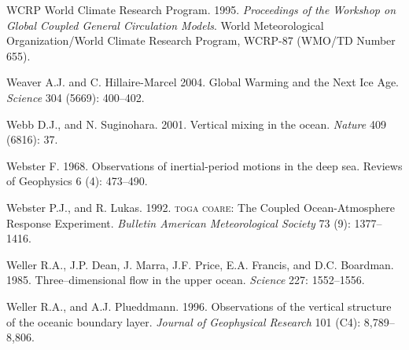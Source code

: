 \begin{thebibliography}{999}
WCRP World Climate Research Program.  1995. \textit{Proceedings of the
  Workshop on Global Coupled General Circulation Models}. World
Meteorological Organization/World Climate Research Program, WCRP-87
(WMO/TD Number 655).
%

Weaver A.J. and C. Hillaire-Marcel 2004. Global Warming and the Next
Ice Age. \textit{Science} 304 (5669): 400--402.
%

Webb D.J., and N. Suginohara.  2001. Vertical mixing in the ocean.
\textit{Nature} 409 (6816): 37.
%

Webster F.  1968. Observations of inertial-period motions in the deep
sea. Reviews of Geophysics 6 (4): 473--490.
%

Webster P.J., and R. Lukas.  1992. \textsc{toga coare}: The Coupled
Ocean-Atmosphere Response Experiment. \textit{Bulletin American
  Meteorological Society} 73 (9): 1377--1416.
%

Weller R.A., J.P. Dean, J. Marra, J.F. Price, E.A. Francis, and D.C.
Boardman. 1985. Three--dimensional flow in the upper
ocean. \textit{Science} 227: 1552--1556.
%

Weller R.A., and A.J. Plueddmann.  1996. Observations of the
  vertical structure of the oceanic boundary layer. \textit{Journal of
    Geophysical Research} 101 (C4): 8,789--8,806.
%


\end{thebibliography}
